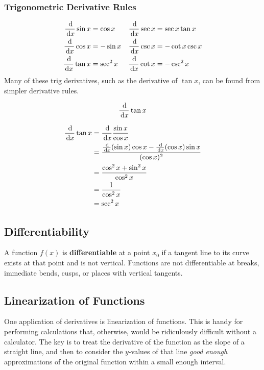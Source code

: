 \subsubsection{Trigonometric Derivative Rules}
\begin{align}
  \frac{\,\mathrm{d}}{\,\mathrm{d} x} \sin x &= \cos x & \frac{\,\mathrm{d}}{\,\mathrm{d} x} \sec x &= \sec x \tan x \\
  \frac{\,\mathrm{d}}{\,\mathrm{d} x} \cos x &= -\sin x & \frac{\,\mathrm{d}}{\,\mathrm{d} x} \csc x &= -\cot x \csc x \\
  \frac{\,\mathrm{d}}{\,\mathrm{d} x} \tan x &= \sec^2 x & \frac{\,\mathrm{d}}{\,\mathrm{d} x} \cot x &= -\csc^2 x
  \label{trigderiv}
\end{align}
Many of these trig derivatives, such as the derivative of $\tan x$, can be found from simpler derivative rules.
\begin{ex}
  \[\frac{\,\mathrm{d}}{\,\mathrm{d} x} \tan x\]
  \begin{sol}
    \begin{align*}
      \frac{\,\mathrm{d}}{\,\mathrm{d} x} \tan x &= \frac{\,\mathrm{d}}{\,\mathrm{d} x} \frac{\sin x}{\cos x} \\
      &= \frac{\frac{\,\mathrm{d}}{\,\mathrm{d} x} (\sin x) \cos x - \frac{\,\mathrm{d}}{\,\mathrm{d} x} (\cos x) \sin x}{(\cos x)^2}\\
      &=\frac{\cos^2 x+\sin^2 x}{\cos^2 x}\\
      &=\frac{1}{\cos^2 x}\\
      &=\sec^2 x
    \end{align*}
  \end{sol}
\end{ex}
\subsection{Differentiability}
A function $f(x)$ is \textbf{differentiable} at a point $x_0$ if a tangent line to its curve exists at that point and is not vertical.
Functions are not differentiable at breaks, immediate bends, cusps, or places with vertical tangents.

\subsection{Linearization of Functions}

One application of derivatives is linearization of functions.
This is handy for performing calculations that, otherwise, would be ridiculously difficult without a calculator.
The key is to treat the derivative of the function as the slope of a straight line,
and then to consider the $y$-values of that line \emph{good enough} approximations of the original function within a small enough interval.

